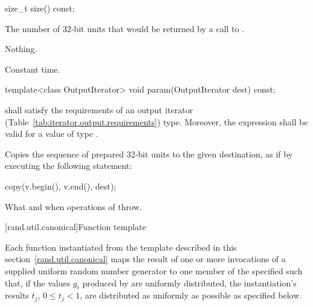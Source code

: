%
%
\begin{itemdecl}
size_t size() const;
\end{itemdecl}

\begin{itemdescr}
\pnum\returns The number of 32-bit units
 that would be returned
 by a call to .

\pnum\throws Nothing.

\pnum\complexity Constant time.
\end{itemdescr}

%
%
\begin{itemdecl}
template<class OutputIterator>
  void param(OutputIterator dest) const;
\end{itemdecl}

\begin{itemdescr}
\pnum\requires
   shall satisfy the requirements
  of an output iterator (Table~\ref{tab:iterator.output.requirements}) type.
  Moreover,
  the expression
  shall be valid for a value  of type .

\pnum\effects Copies the sequence of prepared 32-bit units
 to the given destination,
 as if by executing the following statement:
\begin{codeblock}
copy(v.begin(), v.end(), dest);
\end{codeblock}

\pnum\throws
What and when  operations of  throw.
\end{itemdescr}


[rand.util.canonical]{Function template }%
%

\pnum
 Each function instantiated
 from the template
 described in this section~\ref{rand.util.canonical}
 maps the result of one or more invocations
 of a supplied uniform random number generator 
 to one member
 of the specified 
 such that,
 if the values $g_i$
 produced by 
 are uniformly distributed,
 the instantiation's results
 $t_j$, $ 0 \leq t_j < 1 $,
 are distributed as uniformly as possible
 as specified below.

